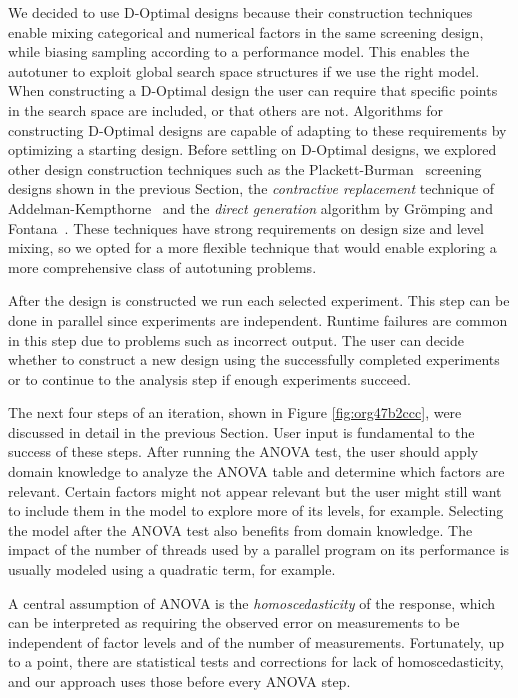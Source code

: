 \documentclass[conference]{IEEEtran}
\begin{document}
We decided to use D-Optimal designs because their construction techniques enable
mixing categorical and numerical factors in the same screening design, while
biasing sampling according to a performance model. This enables the autotuner to
exploit global search space structures if we use the right model. When
constructing a D-Optimal design the user can require that specific points in the
search space are included, or that others are not. Algorithms for constructing
D-Optimal designs are capable of adapting to these requirements by optimizing a
starting design. Before settling on D-Optimal designs, we explored other design
construction techniques such as the
Plackett-Burman~\cite{plackett1946design} screening designs shown in the
previous Section, the \emph{contractive replacement} technique of
Addelman-Kempthorne~\cite{addelman1961some} and the \emph{direct generation}
algorithm by Grömping and Fontana~\cite{ulrike2018algorithm}. These
techniques have strong requirements on design size and level mixing, so we opted
for a more flexible technique that would enable exploring a more comprehensive
class of autotuning problems.

After the design is constructed we run each selected experiment. This step can
be done in parallel since experiments are independent. Runtime failures are
common in this step due to problems such as incorrect output. The user can
decide whether to construct a new design using the successfully completed
experiments or to continue to the analysis step if enough experiments succeed.

The next four steps of an iteration, shown in Figure \ref{fig:org47b2ccc},
were discussed in detail in the previous Section. User input is fundamental to
the success of these steps. After running the ANOVA test, the user should apply
domain knowledge to analyze the ANOVA table and determine which factors are
relevant. Certain factors might not appear relevant but the user might still
want to include them in the model to explore more of its levels, for example.
Selecting the model after the ANOVA test also benefits from domain knowledge.
The impact of the number of threads used by a parallel program on its
performance is usually modeled using a quadratic term, for example.

A central assumption of ANOVA is the \emph{homoscedasticity} of the response, which
can be interpreted as requiring the observed error on measurements to be
independent of factor levels and of the number of measurements. Fortunately, up
to a point, there are statistical tests and corrections for lack of
homoscedasticity, and our approach uses those before every ANOVA step.
\end{document}
